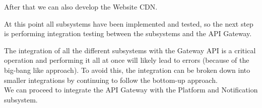 \begin{adjustbox}{
        max size={\textwidth}{},
        caption={Build and Test subsystem},
        label={fig:Build and Test subsystem},
        figure=H}
    \centering
\end{adjustbox}

\begin{adjustbox}{
        max size={\textwidth}{},
        caption={Static Analysis subsystem},
        label={fig:Static Analysis  subsystem},
        figure=H}
    \centering
\end{adjustbox}

\begin{adjustbox}{
        max size={\textwidth}{},
        caption={Badge subsystem},
        label={fig:Badge subsystem},
        figure=H}
    \centering
\end{adjustbox}

After that we can also develop the Website CDN.
\begin{adjustbox}{
        max size={\textwidth}{},
        caption={Website CDN subsystem},
        label={fig:Website CDN subsystem},
        figure=H}
    \centering
\end{adjustbox}

At this point all subsystems have been implemented and tested, so the next step is performing integration
testing between the subsystems and the API Gateway.
\begin{adjustbox}{
        max size={\textwidth}{},
        caption={API Gateway subsystem},
        label={fig:API Gateway subsystem},
        figure=H}
    \centering
\end{adjustbox}

The integration of all the different subsystems with the Gateway API is a critical operation and performing it all at once will likely lead to errors (because of the big-bang like approach).
To avoid this, the integration can be broken down into smaller integrations by continuing to follow the bottom-up approach.\\
We can proceed to integrate the API Gateway with the Platform and Notification subsystem.

\begin{adjustbox}{
        max size={\textwidth}{},
        caption={API Gateway subsystem step 1},
        label={fig:API Gateway subsystem step 1},
        figure=H}
    \centering
\end{adjustbox}

